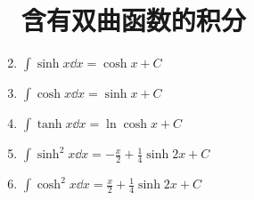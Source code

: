 \begin{enumerate}
\section*{含有双曲函数的积分}
\item \(\int \sinh x \dd{x} = \cosh x + C\)
\item \(\int \cosh x \dd{x} = \sinh x + C\)
\item \(\int \tanh x \dd{x} = \ln\cosh x + C\)
\item \(\int \sinh^2 x \dd{x} = -\frac{x}{2} + \frac{1}{4} \sinh2x + C\)
\item \(\int \cosh^2 x \dd{x} = \frac{x}{2} + \frac{1}{4} \sinh 2x + C\)
\end{enumerate}

